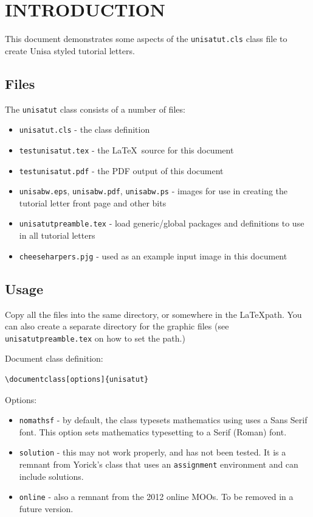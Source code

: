 \documentclass{unisatut}
\begin{document}

\tableofcontents
\listoffigures
\listoftables


\section{INTRODUCTION}
	
This document demonstrates some aspects of the {\tt unisatut.cls} class file to create Unisa styled tutorial letters.

\subsection{Files}

The {\tt unisatut} class consists of a number of files:
\begin{itemize}
	\item{{\tt unisatut.cls} - 
					the class definition}
	\item{{\tt testunisatut.tex} - 
					the \LaTeX\ source for this document}
	\item{{\tt testunisatut.pdf} - 
					the PDF output of this document}
	\item{{\tt unisabw.eps}, {\tt unisabw.pdf}, {\tt unisabw.ps} - 
					images for use in creating the tutorial letter front page and other bits}
	\item{{\tt unisatutpreamble.tex} - 
					load generic/global packages and definitions to use in all tutorial letters}
	\item{{\tt cheeseharpers.pjg} - 
					used as an example input image in this document}
\end{itemize}


\subsection{Usage}

Copy all the files into the same directory, or somewhere in the \LaTeX path. 
You can also create a separate directory for the graphic files 
	(see {\tt unisatutpreamble.tex} on how to set the path.)

Document class definition:
\wl 

\begin{lstlisting}[frame=single]
\documentclass[options]{unisatut}
\end{lstlisting}
Options:
\begin{itemize}
	\item{{\tt nomathsf} - 
		by default, the class typesets mathematics using uses a Sans Serif font. 
		This option sets mathematics typesetting to a Serif (Roman) font.}
	\item{{\tt solution} - 
		this may not work properly, and has not been tested. 
		It is a remnant from Yorick's class that uses an {\tt assignment} environment and can include solutions.}
	\item{{\tt online} - also a remnant from the 2012 online MOOs. To be removed in a future version.}
\end{itemize}
\end{document}
